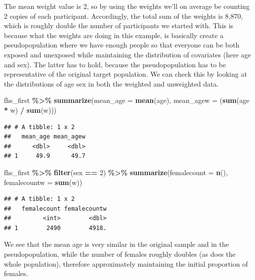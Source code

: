 \documentclass[
]{book}
\newenvironment{Shaded}{\begin{snugshade}}{\end{snugshade}}
\newcommand{\AttributeTok}[1]{\textcolor[rgb]{0.13,0.29,0.53}{#1}}
\newcommand{\DecValTok}[1]{\textcolor[rgb]{0.00,0.00,0.81}{#1}}
\newcommand{\FunctionTok}[1]{\textcolor[rgb]{0.13,0.29,0.53}{\textbf{#1}}}
\newcommand{\NormalTok}[1]{#1}
\newcommand{\SpecialCharTok}[1]{\textcolor[rgb]{0.81,0.36,0.00}{\textbf{#1}}}
\begin{document}
The mean weight value is 2, so by using the weights we'll on average be counting 2 copies of each participant. Accordingly, the total sum of the weights is 8,870, which is roughly double the number of participants we started with. This is because what the weights are doing in this example, is basically create a pseudopopulation where we have enough people so that everyone can be both exposed and unexposed while maintaining the distribution of covariates (here age and sex). The latter has to hold, because the pseudopopulation has to be representative of the original target population. We can check this by looking at the distributions of age sex in both the weighted and unweighted data.

\begin{Shaded}
\begin{Highlighting}[]
\NormalTok{fhs\_first }\SpecialCharTok{\%\textgreater{}\%}
  \FunctionTok{summarize}\NormalTok{(}\AttributeTok{mean\_age =} \FunctionTok{mean}\NormalTok{(age),}
            \AttributeTok{mean\_agew =}\NormalTok{ (}\FunctionTok{sum}\NormalTok{(age }\SpecialCharTok{*}\NormalTok{ w) }\SpecialCharTok{/} \FunctionTok{sum}\NormalTok{(w)))}
\end{Highlighting}
\end{Shaded}

\begin{verbatim}
## # A tibble: 1 x 2
##   mean_age mean_agew
##      <dbl>     <dbl>
## 1     49.9      49.7
\end{verbatim}

\begin{Shaded}
\begin{Highlighting}[]
\NormalTok{fhs\_first }\SpecialCharTok{\%\textgreater{}\%}
  \FunctionTok{filter}\NormalTok{(sex }\SpecialCharTok{==} \DecValTok{2}\NormalTok{) }\SpecialCharTok{\%\textgreater{}\%}
  \FunctionTok{summarize}\NormalTok{(}\AttributeTok{femalecount =} \FunctionTok{n}\NormalTok{(),}
            \AttributeTok{femalecountw =} \FunctionTok{sum}\NormalTok{(w))}
\end{Highlighting}
\end{Shaded}

\begin{verbatim}
## # A tibble: 1 x 2
##   femalecount femalecountw
##         <int>        <dbl>
## 1        2490        4918.
\end{verbatim}

We see that the mean age is very similar in the original sample and in the pseudopopulation, while the number of females roughly doubles (as does the whole population), therefore approximately maintaining the initial proportion of females.
\end{document}
